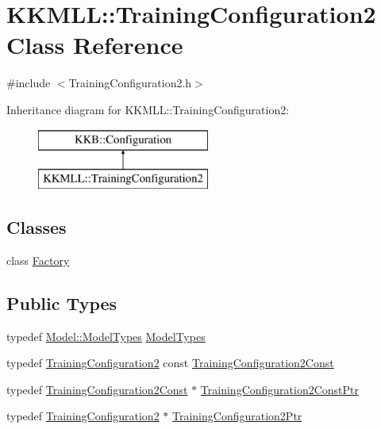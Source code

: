 \hypertarget{class_k_k_m_l_l_1_1_training_configuration2}{}\section{K\+K\+M\+LL\+:\+:Training\+Configuration2 Class Reference}
\label{class_k_k_m_l_l_1_1_training_configuration2}


{\ttfamily \#include $<$Training\+Configuration2.\+h$>$}

Inheritance diagram for K\+K\+M\+LL\+:\+:Training\+Configuration2\+:\begin{figure}[H]
\begin{center}
\leavevmode
\includegraphics[height=2.000000cm]{class_k_k_m_l_l_1_1_training_configuration2}
\end{center}
\end{figure}
\subsection*{Classes}
\begin{DoxyCompactItemize}
\item 
class \hyperlink{class_k_k_m_l_l_1_1_training_configuration2_1_1_factory}{Factory}
\end{DoxyCompactItemize}
\subsection*{Public Types}
\begin{DoxyCompactItemize}
\item 
typedef \hyperlink{class_k_k_m_l_l_1_1_model_aeda4060e088c67446ca993eefcecea06}{Model\+::\+Model\+Types} \hyperlink{class_k_k_m_l_l_1_1_training_configuration2_ab6544af2d8be1885e676b81a10324cda}{Model\+Types}
\item 
typedef \hyperlink{class_k_k_m_l_l_1_1_training_configuration2}{Training\+Configuration2} const \hyperlink{class_k_k_m_l_l_1_1_training_configuration2_a4d33ba048f73ef16a421b40e39ddc80b}{Training\+Configuration2\+Const}
\item 
typedef \hyperlink{class_k_k_m_l_l_1_1_training_configuration2_a4d33ba048f73ef16a421b40e39ddc80b}{Training\+Configuration2\+Const} $\ast$ \hyperlink{class_k_k_m_l_l_1_1_training_configuration2_ac571c80e182ec908dabdfd3097142b89}{Training\+Configuration2\+Const\+Ptr}
\item 
typedef \hyperlink{class_k_k_m_l_l_1_1_training_configuration2}{Training\+Configuration2} $\ast$ \hyperlink{class_k_k_m_l_l_1_1_training_configuration2_a16dd529d03718630f6f58f572e9535f8}{Training\+Configuration2\+Ptr}
\end{DoxyCompactItemize}
